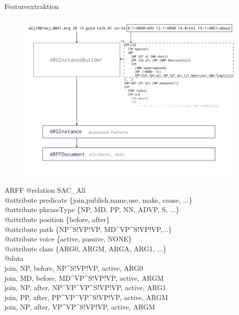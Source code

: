 \documentclass[10pt]{beamer}
\begin{document}
\begin{frame}{Featureextraktion} 
  \begin{figure}
	  \begin{center}
	  	\includegraphics[scale=0.2]{argext_graphic}
	  \end{center}
  \end{figure}
\end{frame}

\begin{frame}{ARFF}
	@relation SAC\_All \\
	\vspace{5pt}
	@attribute predicate \{join,publish,name,use, make, cause, ...\} \\
	@attribute phraseType \{NP, MD, PP, NN, ADVP, S, ...\} \\
	@attribute position \{before, after\} \\
	@attribute path \{NP\^{}S!VP!VP, MD\^{}VP\^{}S!VP!VP,...\} \\
	@attribute voice \{active, passive, NONE\} \\
	@attribute class \{ARG0, ARGM, ARGA, ARG1, ...\} \\
	\vspace{10pt}
	@data \\
	join, NP, before, NP\^{}S!VP!VP, active, ARG0 \\
	join, MD, before, MD\^{}VP\^{}S!VP!VP, active, ARGM \\
	join, NP, after, NP\^{}VP\^{}VP\^{}S!VP!VP, active, ARG1 \\
	join, PP, after, PP\^{}VP\^{}VP\^{}S!VP!VP, active, ARGM \\
	join, NP, after, VP\^{}VP\^{}S!VP!VP, active, ARGM \\

\end{frame}
\end{document}
